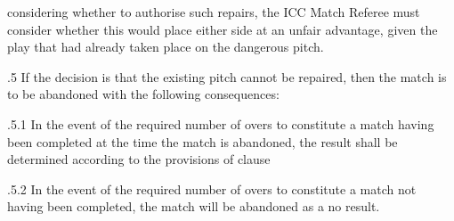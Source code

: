 \documentclass[12pt]{article}
\begin{document}
\vspace{\baselineskip}

\vspace{\baselineskip}
\begin{adjustwidth}{0.5in}{0.03in}
{\fontsize{8pt}{9.6pt}\selectfont considering whether to authorise such repairs, the ICC Match Referee must consider whether this would place either side at an unfair advantage, given the play that had already taken place on the dangerous pitch.\par}\par

\end{adjustwidth}


\vspace{\baselineskip}
\begin{adjustwidth}{0.5in}{0.36in}
{\fontsize{9pt}{10.8pt}.5 \tabto{0.49in} If the decision is that the existing pitch cannot be repaired, then the match is to be abandoned with the following consequences:\par}\par

\end{adjustwidth}


\vspace{\baselineskip}
\begin{adjustwidth}{1.18in}{0.01in}
{\fontsize{9pt}{10.8pt}.5.1 \tabto{1.17in} In the event of the required number of overs to constitute a match having been completed at the time the match is abandoned, the result shall be determined according to the provisions of clause \par}\par

\end{adjustwidth}


\vspace{\baselineskip}
\begin{adjustwidth}{1.18in}{0.12in}
{\fontsize{9pt}{10.8pt}.5.2 \tabto{1.17in} In the event of the required number of overs to constitute a match not having been completed, the match will be abandoned as a no result.\par}\par

\end{adjustwidth}
\end{document}
